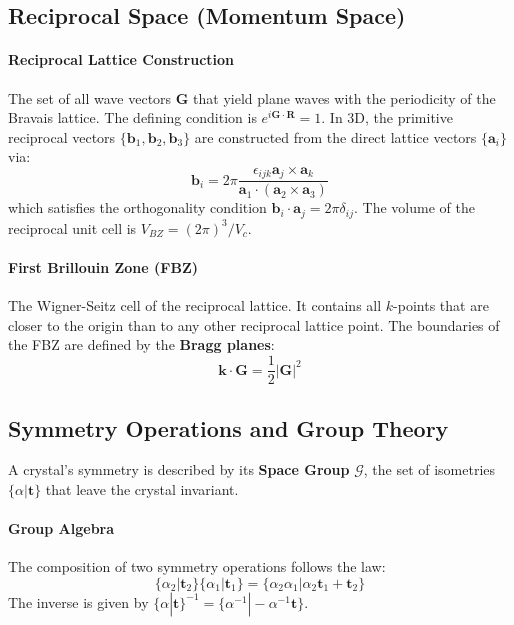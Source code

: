 \documentclass[10pt, a4paper]{article}
\begin{document}
\subsection{Reciprocal Space (Momentum Space)}

\paragraph{Reciprocal Lattice Construction}
The set of all wave vectors $\mathbf{G}$ that yield plane waves with the periodicity of the Bravais lattice. The defining condition is $e^{i \mathbf{G} \cdot \mathbf{R}} = 1$. In 3D, the primitive reciprocal vectors $\{\mathbf{b}_1, \mathbf{b}_2, \mathbf{b}_3\}$ are constructed from the direct lattice vectors $\{\mathbf{a}_i\}$ via:
\begin{equation}
    \mathbf{b}_i = 2\pi \frac{\epsilon_{ijk} \mathbf{a}_j \times \mathbf{a}_k}{\mathbf{a}_1 \cdot (\mathbf{a}_2 \times \mathbf{a}_3)}
\end{equation}
which satisfies the orthogonality condition $\mathbf{b}_i \cdot \mathbf{a}_j = 2\pi \delta_{ij}$. The volume of the reciprocal unit cell is $V_{BZ} = (2\pi)^3 / V_c$.

\paragraph{First Brillouin Zone (FBZ)}
The Wigner-Seitz cell of the reciprocal lattice. It contains all $k$-points that are closer to the origin than to any other reciprocal lattice point. The boundaries of the FBZ are defined by the \textbf{Bragg planes}:
\begin{equation}
    \mathbf{k} \cdot \mathbf{G} = \frac{1}{2} |\mathbf{G}|^2
\end{equation}



\subsection{Symmetry Operations and Group Theory}

A crystal's symmetry is described by its \textbf{Space Group} $\mathcal{G}$, the set of isometries $\{ \alpha | \mathbf{t} \}$ that leave the crystal invariant.

\paragraph{Group Algebra}
The composition of two symmetry operations follows the law:
\begin{equation}
    \{ \alpha_2 | \mathbf{t}_2 \} \{ \alpha_1 | \mathbf{t}_1 \} = \{ \alpha_2 \alpha_1 | \alpha_2 \mathbf{t}_1 + \mathbf{t}_2 \}
\end{equation}
The inverse is given by $\{ \alpha | \mathbf{t} \}^{-1} = \{ \alpha^{-1} | -\alpha^{-1} \mathbf{t} \}$.
\end{document}
